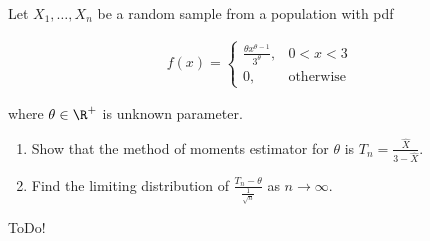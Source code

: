 
\begin{exercise}

Let $X_1, \dots, X_n$ be a random sample from a population with pdf

\begin{align*}
    f(x)
    =
    \begin{cases}
        \frac{\theta x^{\theta - 1}}{3^\theta},
        & 0 < x < 3 \\
        0,
        & \text{otherwise}
    \end{cases}
\end{align*}

where $\theta \in \R^+$ is unknown parameter.

\begin{enumerate}[label = (\alph*)]
    \item Show that the method of moments estimator for $\theta$ is $T_n = \frac{\hat X}{3 - \hat X}$.
    \item Find the limiting distribution of $\frac{T_n - \theta}{\frac{1}{\sqrt n}}$ as $n \to \infty$.
\end{enumerate}

\end{exercise}


\begin{solution}

ToDo!

\end{solution}

